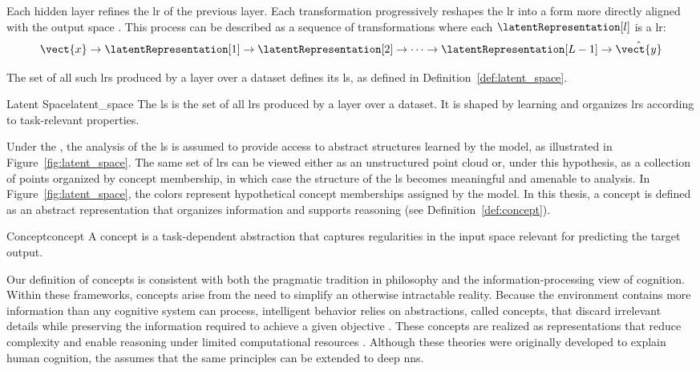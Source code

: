 Each hidden layer refines the \gls{lr} of the previous layer.
Each transformation progressively reshapes the \gls{lr} into a form more directly aligned with the output space \parencite{rumelhart1986learning}.
This process can be described as a sequence of transformations where each $\latentRepresentation[l]$ is a \gls{lr}:
\[
\vect{x} \rightarrow \latentRepresentation[1] \rightarrow \latentRepresentation[2] \rightarrow \dots \rightarrow \latentRepresentation[L-1] \rightarrow \hat{\vect{y}}
\]

The set of all such \glspl{lr} produced by a layer over a dataset defines its \gls{ls}, as defined in Definition~\ref{def:latent_space}.

\begin{definition}{Latent Space}{latent_space}
The \gls{ls} is the set of all \glspl{lr} produced by a layer over a dataset.
It is shaped by learning and organizes \glspl{lr} according to task-relevant properties.
\end{definition}

Under the \ConceptHypothesisName, the analysis of the \gls{ls} is assumed to provide access to abstract structures learned by the model, as illustrated in Figure~\ref{fig:latent_space}.
The same set of \glspl{lr} can be viewed either as an unstructured point cloud or, under this hypothesis, as a collection of points organized by concept membership, in which case the structure of the \gls{ls} becomes meaningful and amenable to analysis.
In Figure~\ref{fig:latent_space}, the colors represent hypothetical concept memberships assigned by the model.
In this thesis, a concept is defined as an abstract representation that organizes information and supports reasoning (see Definition~\ref{def:concept}).



\begin{definition}{Concept}{concept}
A concept is a task-dependent abstraction that captures regularities in the input space relevant for predicting the target output.
\end{definition} 

Our definition of concepts is consistent with both the pragmatic tradition in philosophy and the information-processing view of cognition.
Within these frameworks, concepts arise from the need to simplify an otherwise intractable reality.
Because the environment contains more information than any cognitive system can process, intelligent behavior relies on abstractions, called concepts, that discard irrelevant details while preserving the information required to achieve a given objective \parencite{Peirce1878,Misak2013}.
These concepts are realized as representations that reduce complexity and enable reasoning under limited computational resources \parencite{Newell1980,Simon1996}.
Although these theories were originally developed to explain human cognition, the \ConceptHypothesisName assumes that the same principles can be extended to deep \glspl{nn}.

